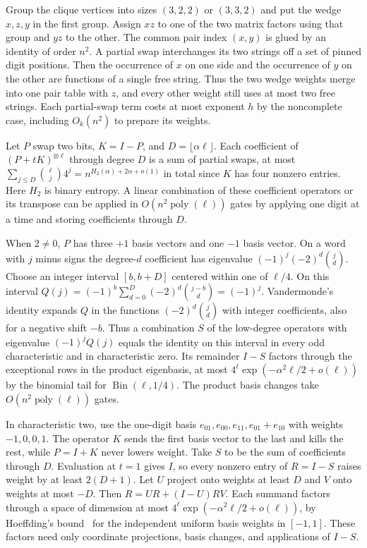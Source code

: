 \documentclass[11pt,letterpaper]{article}
\begin{document}
Group the clique vertices into sizes \((3,2,2)\) or \((3,3,2)\) and put the wedge \(x,z,y\) in the first group. Assign \(xz\) to one of the two matrix factors using that group and \(yz\) to the other. The common pair index \((x,y)\) is glued by an identity of order \(n^2\). A partial swap interchanges its two strings off a set of pinned digit positions. Then the occurrence of \(x\) on one side and the occurrence of \(y\) on the other are functions of a single free string. Thus the two wedge weights merge into one pair table with \(z\), and every other weight still uses at most two free strings. Each partial-swap term costs at most exponent \(h\) by the noncomplete case, including \(O_k(n^2)\) to prepare its weights.

Let \(P\) swap two bits, \(K=I-P\), and \(D=\lfloor\alpha\ell\rfloor\). Each coefficient of \((P+tK)^{\otimes\ell}\) through degree \(D\) is a sum of partial swaps, at most \(\sum_{j\le D}\binom{\ell}{j}4^j=n^{H_2(\alpha)+2\alpha+o(1)}\) in total since \(K\) has four nonzero entries. Here \(H_2\) is binary entropy. A linear combination of these coefficient operators or its transpose can be applied in \(O(n^2\operatorname{poly}(\ell))\) gates by applying one digit at a time and storing coefficients through \(D\).

When \(2\ne0\), \(P\) has three \(+1\) basis vectors and one \(-1\) basis vector. On a word with \(j\) minus signs the degree-\(d\) coefficient has eigenvalue \((-1)^j(-2)^d\binom jd\). Choose an integer interval \([b,b+D]\) centered within one of \(\ell/4\). On this interval \(Q(j)=(-1)^b\sum_{d=0}^D(-2)^d\binom{j-b}{d}=(-1)^j\). Vandermonde's identity expands \(Q\) in the functions \((-2)^d\binom jd\) with integer coefficients, also for a negative shift \(-b\). Thus a combination \(S\) of the low-degree operators with eigenvalue \((-1)^jQ(j)\) equals the identity on this interval in every odd characteristic and in characteristic zero. Its remainder \(I-S\) factors through the exceptional rows in the product eigenbasis, at most \(4^\ell\exp(-\alpha^2\ell/2+o(\ell))\) by the binomial tail for \(\operatorname{Bin}(\ell,1/4)\). The product basis changes take \(O(n^2\operatorname{poly}(\ell))\) gates.

In characteristic two, use the one-digit basis \(e_{01},e_{00},e_{11},e_{01}+e_{10}\) with weights \(-1,0,0,1\). The operator \(K\) sends the first basis vector to the last and kills the rest, while \(P=I+K\) never lowers weight. Take \(S\) to be the sum of coefficients through \(D\). Evaluation at \(t=1\) gives \(I\), so every nonzero entry of \(R=I-S\) raises weight by at least \(2(D+1)\). Let \(U\) project onto weights at least \(D\) and \(V\) onto weights at most \(-D\). Then \(R=UR+(I-U)RV\). Each summand factors through a space of dimension at most \(4^\ell\exp(-\alpha^2\ell/2+o(\ell))\), by Hoeffding's bound~\cite[Theorem~2]{hoeffding} for the independent uniform basis weights in \([-1,1]\). These factors need only coordinate projections, basis changes, and applications of \(I-S\).
\end{document}
